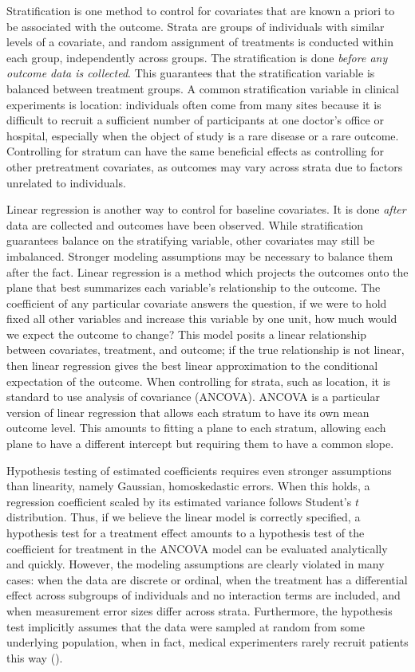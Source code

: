 \documentclass[12pt]{article}
\begin{document}
Stratification is one method to control for covariates that are known a priori to be associated with the outcome.
Strata are groups of individuals with similar levels of a covariate, and random assignment of treatments is conducted within each group, independently across groups.
The stratification is done \textit{before any outcome data is collected}.
This guarantees that the stratification variable is balanced between treatment groups.
A common stratification variable in clinical experiments is location:
individuals often come from many sites because it is difficult to recruit a sufficient number of participants at one doctor's office or hospital,
especially when the object of study is a rare disease or a rare outcome.
Controlling for stratum can have the same beneficial effects as controlling for other pretreatment covariates, 
as outcomes may vary across strata due to factors unrelated to individuals.

Linear regression is another way to control for baseline covariates.
It is done \textit{after} data are collected and outcomes have been observed.
While stratification guarantees balance on the stratifying variable, other covariates may still be imbalanced.
Stronger modeling assumptions may be necessary to balance them after the fact.
Linear regression is a method which projects the outcomes onto the plane that best summarizes each variable's relationship to the outcome.
The coefficient of any particular covariate answers the question, if we were to hold fixed all other variables and increase this variable by one unit, how much would we expect the outcome to change?
This model posits a linear relationship between covariates, treatment, and outcome; 
if the true relationship is not linear, then linear regression gives the best linear approximation to the conditional expectation of the outcome.
When controlling for strata, such as location, it is standard to use analysis of covariance (ANCOVA).
ANCOVA is a particular version of linear regression that allows each stratum to have its own mean outcome level.
This amounts to fitting a plane to each stratum, allowing each plane to have a different intercept but requiring them to have a common slope.

Hypothesis testing of estimated coefficients requires even stronger assumptions than linearity, namely Gaussian, homoskedastic errors.
When this holds, a regression coefficient scaled by its estimated variance follows Student's $t$ distribution.
Thus, if we believe the linear model is correctly specified, a hypothesis test for a treatment effect amounts to a hypothesis test of the coefficient for treatment in the ANCOVA model can be evaluated analytically and quickly.
However, the modeling assumptions are clearly violated in many cases:
when the data are discrete or ordinal, 
when the treatment has a differential effect across subgroups of individuals and no interaction terms are included, 
and when measurement error sizes differ across strata.
Furthermore, the hypothesis test implicitly assumes that the data were sampled at random from some underlying population, when in fact,
medical experimenters rarely recruit patients this way (\cite{ludbrook_why_1998}).
\end{document}
